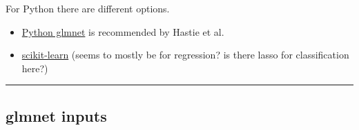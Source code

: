\documentclass[
]{article}
\providecommand{\tightlist}{%
  \setlength{\itemsep}{0pt}\setlength{\parskip}{0pt}}
\begin{document}
For Python there are different options.

\begin{itemize}
\tightlist
\item
  \href{https://web.stanford.edu/~hastie/glmnet_python/}{Python glmnet}
  is recommended by Hastie et al.
\item
  \href{https://scikit-learn.org/stable/modules/linear_model.html\#ridge-regression-and-classification}{scikit-learn}
  (seems to mostly be for regression? is there lasso for classification
  here?)
\end{itemize}

\begin{center}\rule{0.5\linewidth}{0.5pt}\end{center}

\hypertarget{glmnet-inputs}{%
\subsection{glmnet inputs}\label{glmnet-inputs}}
\end{document}
